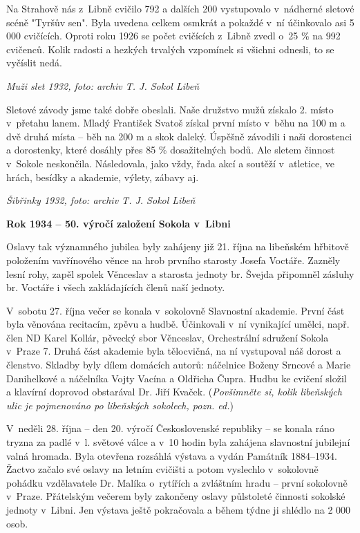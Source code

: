 \documentclass[a5paper, 12pt, twoside]{article}
\begin{document}
Na Strahově nás z~Libně cvičilo 792 a dalších 200 vystupovalo v~nádherné
sletové scéně "Tyršův sen". Byla uvedena celkem osmkrát a pokaždé v~ní
účinkovalo asi 5 000 cvičících. Oproti roku 1926 se počet cvičících
z~Libně zvedl o~25 \% na 992 cvičenců. Kolik radosti a hezkých trvalých
vzpomínek si všichni odnesli, to se vyčíslit nedá.


\textit{Muži slet 1932, foto: archiv T. J. Sokol Libeň}

Sletové závody jsme také dobře obeslali. Naše družstvo mužů získalo 2.
místo v~přetahu lanem. Mladý František Svatoš získal první místo v~běhu
na 100 m a dvě druhá místa -- běh na 200 m a skok daleký. Úspěšně
závodili i naši dorostenci a dorostenky, které dosáhly přes 85 \%
dosažitelných bodů. Ale sletem činnost v~Sokole neskončila. Následovala,
jako vždy, řada akcí a soutěží v~atletice, ve hrách, besídky a akademie,
výlety, zábavy aj.


\textit{Šibřinky 1932, foto: archiv T. J. Sokol Libeň}

\textbf{Rok 1934 -- 50. výročí založení Sokola v~Libni}

Oslavy tak významného jubilea byly zahájeny již 21. října na libeňském
hřbitově položením vavřínového věnce na hrob prvního starosty Josefa
Voctáře. Zazněly lesní rohy, zapěl spolek Věnceslav a starosta jednoty
br. Švejda připomněl zásluhy br. Voctáře i všech zakládajících členů
naší jednoty.

V~sobotu 27. října večer se konala v~sokolovně Slavnostní akademie.
První část byla věnována recitacím, zpěvu a hudbě. Účinkovali v~ní
vynikající umělci, např. člen ND Karel Kollár, pěvecký sbor Věnceslav,
Orchestrální sdružení Sokola v~Praze 7. Druhá část akademie byla
tělocvičná, na ní vystupoval náš dorost a členstvo. Skladby byly dílem
domácích autorů: náčelnice Boženy Srncové a Marie Danihelkové a
náčelníka Vojty Vacína a Oldřicha Čupra. Hudbu ke cvičení složil a
klavírní doprovod obstarával Dr. Jiří Kvaček. (\textit{Povšimněte si,
kolik libeňských ulic je pojmenováno po libeňských sokolech, pozn. ed.})

V~neděli 28. října -- den 20. výročí Československé republiky -- se
konala ráno tryzna za padlé v~l. světové válce a v~10 hodin byla
zahájena slavnostní jubilejní valná hromada. Byla otevřena rozsáhlá
výstava a vydán Památník 1884--1934. Žactvo začalo své oslavy
na letním cvičišti a potom vyslechlo v~sokolovně pohádku vzdělavatele
Dr. Malíka o~rytířích a zvláštním hradu -- první sokolovně v~Praze.
Přátelským večerem byly zakončeny oslavy půlstoleté činnosti sokolské
jednoty v~Libni. Jen výstava ještě pokračovala a během týdne ji shlédlo
na 2 000 osob.
\end{document}
